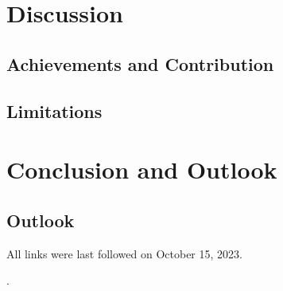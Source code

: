 \documentclass[
  a4paper,  %
  twoside,  %
  bibliography=totoc,
  headsepline,
  cleardoublepage=empty,
  parskip=half,
  draft=false
]{scrbook}
\begin{document}
\chapter{Discussion}
\label{chap:discussion}
\section{Achievements and Contribution}
\label{sec:achievementsAndContribution}
\section{Limitations}
\label{sec:limitations}


\chapter{Conclusion and Outlook}
\label{chap:zusfas}

\section{Outlook}

\printbibliography

All links were last followed on October 15, 2023.

\appendix
.

\pagestyle{empty}
\renewcommand*{\chapterpagestyle}{empty}
\Versicherung
\end{document}
